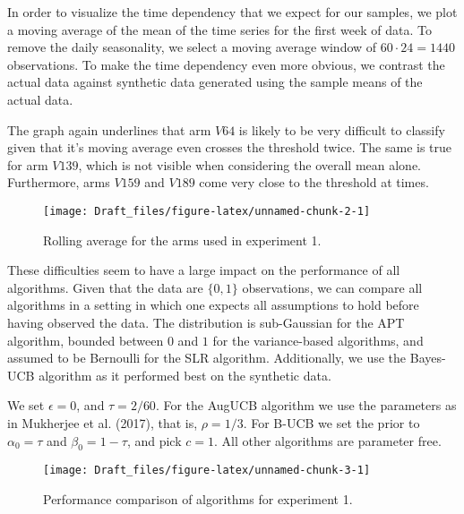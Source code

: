\documentclass[11pt,]{article}
\begin{document}
In order to visualize the time dependency that we expect for our
samples, we plot a moving average of the mean of the time series for the
first week of data. To remove the daily seasonality, we select a moving
average window of \(60\cdot24 = 1440\) observations. To make the time
dependency even more obvious, we contrast the actual data against
synthetic data generated using the sample means of the actual data.

The graph again underlines that arm \(V64\) is likely to be very
difficult to classify given that it's moving average even crosses the
threshold twice. The same is true for arm \(V139\), which is not visible
when considering the overall mean alone. Furthermore, arms \(V159\) and
\(V189\) come very close to the threshold at times.

\begin{figure}

{\centering \texttt{[image: Draft\_files/figure-latex/unnamed-chunk-2-1]} 

}

\caption{Rolling average for the arms used in experiment 1.}\label{fig:unnamed-chunk-2}
\end{figure}

These difficulties seem to have a large impact on the performance of all
algorithms. Given that the data are \(\{0,1\}\) observations, we can
compare all algorithms in a setting in which one expects all assumptions
to hold before having observed the data. The distribution is
sub-Gaussian for the APT algorithm, bounded between \(0\) and \(1\) for
the variance-based algorithms, and assumed to be Bernoulli for the SLR
algorithm. Additionally, we use the Bayes-UCB algorithm as it performed
best on the synthetic data.

We set \(\epsilon = 0\), and \(\tau = 2/60\). For the AugUCB algorithm
we use the parameters as in Mukherjee et al. (2017), that is,
\(\rho = 1/3\). For B-UCB we set the prior to \(\alpha_0 = \tau\) and
\(\beta_0 = 1-\tau\), and pick \(c=1\). All other algorithms are
parameter free.

\begin{figure}

{\centering \texttt{[image: Draft\_files/figure-latex/unnamed-chunk-3-1]} 

}

\caption{Performance comparison of algorithms for experiment 1.}\label{fig:unnamed-chunk-3}
\end{figure}
\end{document}
